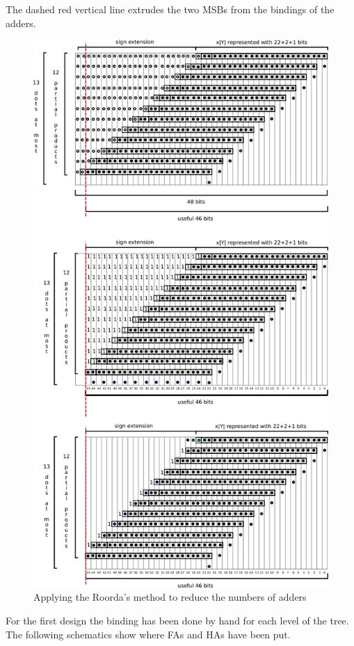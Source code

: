 \documentclass[a4paper]{article}
\begin{document}
	The dashed red vertical line extrudes the two MSBs from the bindings of the adders.

	\begin{figure}[hbtp]
	\centering
	\includegraphics[width=.6\linewidth]{media/v1_FA_dadda_bindings_4.png}
	\caption{Applying the Roorda's method to reduce the numbers of adders}
	\label{fig:v1-bind4}
	\end{figure}

	For the first design the binding has been done by hand for each level of the tree. The following schematics show where FAs and HAs have been put.
\end{document}
